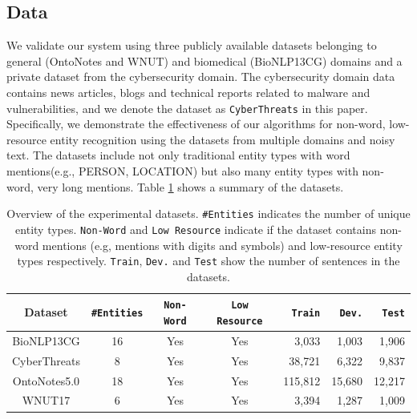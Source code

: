 \subsection{Data}
 
We validate our system using three publicly available datasets  belonging to general (OntoNotes and WNUT) and biomedical (BioNLP13CG) domains
 and a private dataset from the cybersecurity domain. 
 The cybersecurity domain data contains news articles, blogs and technical reports related to malware and vulnerabilities, and
 we denote the dataset as \texttt{CyberThreats} in this paper.
Specifically, we demonstrate the effectiveness of our algorithms for non-word, low-resource entity recognition using the datasets from multiple domains and noisy text.
The datasets include not only traditional entity types with word mentions(e.g., PERSON, LOCATION) but also many entity types with non-word, very long mentions.  
Table \ref{tab:datasets_summary} shows a summary of the datasets.
\begin{table}[h!]
\centering
\begin{small}
\begin{tabular}{ccccrrr}\toprule
 \textbf{Dataset} & \texttt{\#Entities} & \texttt{Non-Word} & \texttt{Low Resource} & \texttt{Train} & \texttt{Dev.} & \texttt{Test} \\ \toprule 
BioNLP13CG & 16 & Yes & Yes & 3,033  & 1,003 & 1,906 \\
CyberThreats & 8 & Yes & Yes & 38,721 & 6,322 & 9,837 \\
OntoNotes5.0 & 18 & Yes & Yes & 115,812 & 15,680 & 12,217 \\  
WNUT17 & 6 & Yes & Yes & 3,394 & 1,287 & 1,009\\
\bottomrule
\end{tabular}
\caption{Overview of the experimental datasets. \texttt{\#Entities} indicates the number of unique entity types.
\texttt{Non-Word} and \texttt{Low Resource} indicate if the dataset contains non-word mentions (e.g, mentions with digits and symbols) and
low-resource entity types respectively.  
\texttt{Train}, \texttt{Dev.} and \texttt{Test} show the number of sentences in the datasets.}
\label{tab:datasets_summary}
\end{small}
\end{table}



